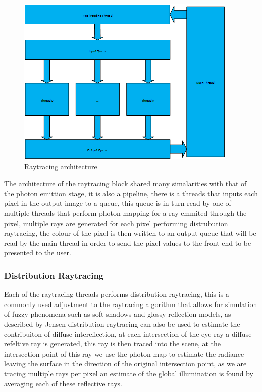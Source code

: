 \begin{figure}
\centering
\includegraphics{./images/pixel_threading.png}
\caption{Raytracing architecture}
\label{fig:pixel_generation}
\end{figure}

The architecture of the raytracing block shared many simalarities with that of the photon emittion stage,
it is also a pipeline, there is a threads that inputs each pixel in the output image to a queue, this queue
is in turn read by one of multiple threads that perform photon mapping for a ray emmited through the pixel,
multiple rays are generated for each pixel performing distrubution raytracing, the colour of the pixel is
then written to an output queue that will be read by the main thread in order to send the pixel values to
the front end to be presented to the user.

\subsubsection{Distribution Raytracing}
Each of the raytracing threads performs distribution raytracing, this is a commonly used adjustment to the 
raytracing algorithm that allows for simulation of fuzzy phenomena such as soft shadows and glossy reflection
models, as described by Jensen  distribution raytracing can also be used to estimate the contribuiton
of diffuse intereflection, at each intersection of the eye ray a diffuse refeltive  ray is generated, this ray is then traced into the scene, at the intersection point of this ray
we use the photon map to estimate the radiance leaving the surface in the direction of the original intersection
point, as we are tracing multiple rays per pixel an estimate of the global illumination is found by averaging each
of these reflective rays.

